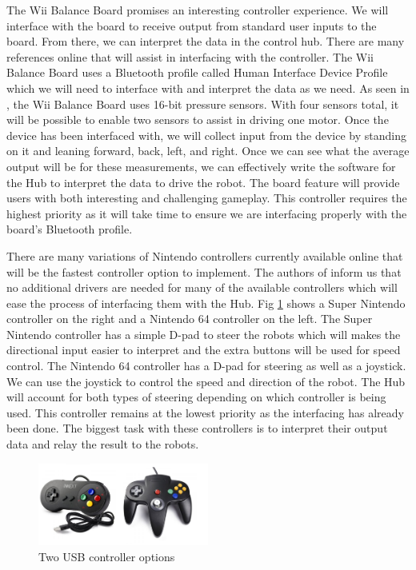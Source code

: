 \documentclass[11pt]{ieeeconf}
\begin{document}
The Wii Balance Board promises an interesting controller experience. We will interface with the board to receive output from standard user inputs to the board. From there, we can interpret the data in the control hub. There are many references online that will assist in interfacing with the controller. The Wii Balance Board uses a Bluetooth profile called Human Interface Device Profile which we will need to interface with and interpret the data as we need. As seen in \cite{homebrew}, the Wii Balance Board uses 16-bit pressure sensors. With four sensors total, it will be possible to enable two sensors to assist in driving one motor. Once the device has been interfaced with, we will collect input from the device by standing on it and leaning forward, back, left, and right. Once we can see what the average output will be for these measurements, we can effectively write the software for the Hub to interpret the data to drive the robot. The board feature will provide users with both interesting and challenging gameplay. This controller requires the highest priority as it will take time to ensure we are interfacing properly with the board's Bluetooth profile. 

There are many variations of Nintendo controllers currently available online that will be the fastest controller option to implement. The authors of \cite{controller:19} inform us that no additional drivers are needed for many of the available controllers which will ease the process of interfacing them with the Hub. Fig \ref{Controllers} shows a Super Nintendo controller on the right and a Nintendo 64 controller on the left. The Super Nintendo controller has a simple D-pad to steer the robots which will makes the directional input easier to interpret and the extra buttons will be used for speed control. The Nintendo 64 controller has a D-pad for steering as well as a joystick. We can use the joystick to control the speed and direction of the robot. The Hub will account for both types of steering depending on which controller is being used. This controller remains at the lowest priority as the interfacing has already been done. The biggest task with these controllers is to interpret their output data and relay the result to the robots.

\begin{figure}[H]
\centering
\captionsetup{justification=centering}
\includegraphics[width=0.5\textwidth]{images/controllers.png}
\caption{Two USB controller options \cite{controller:19}}
\label{Controllers}
\end{figure}
\end{document}
